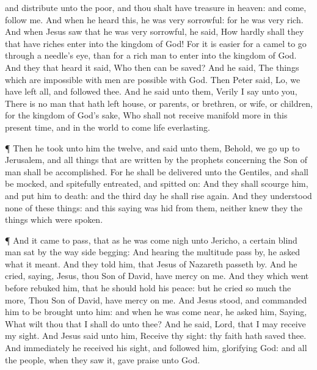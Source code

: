 and distribute unto the poor, and thou shalt have treasure in heaven:
and come, follow me.  And when he heard this, he was very
sorrowful: for he was very rich.  And when Jesus saw that
he was very sorrowful, he said, How hardly shall they that have riches
enter into the kingdom of God!  For it is easier for a
camel to go through a needle's eye, than for a rich man to enter into
the kingdom of God.  And they that heard it said, Who then
can be saved?  And he said, The things which are impossible
with men are possible with God.  Then Peter said, Lo, we
have left all, and followed thee.  And he said unto them,
Verily I say unto you, There is no man that hath left house, or parents,
or brethren, or wife, or children, for the kingdom of God's sake,
 Who shall not receive manifold more in this present time,
and in the world to come life everlasting.

 ¶ Then he took unto him the twelve, and said unto them,
Behold, we go up to Jerusalem, and all things that are written by the
prophets concerning the Son of man shall be accomplished. 
For he shall be delivered unto the Gentiles, and shall be mocked, and
spitefully entreated, and spitted on:  And they shall
scourge him, and put him to death: and the third day he shall rise
again.  And they understood none of these things: and this
saying was hid from them, neither knew they the things which were
spoken.

 ¶ And it came to pass, that as he was come nigh unto
Jericho, a certain blind man sat by the way side begging: 
And hearing the multitude pass by, he asked what it meant. 
And they told him, that Jesus of Nazareth passeth by.  And
he cried, saying, Jesus, thou Son of David, have mercy on me.
 And they which went before rebuked him, that he should
hold his peace: but he cried so much the more, Thou Son of David, have
mercy on me.  And Jesus stood, and commanded him to be
brought unto him: and when he was come near, he asked him, 
Saying, What wilt thou that I shall do unto thee? And he said, Lord,
that I may receive my sight.  And Jesus said unto him,
Receive thy sight: thy faith hath saved thee.  And
immediately he received his sight, and followed him, glorifying God: and
all the people, when they saw it, gave praise unto God.

